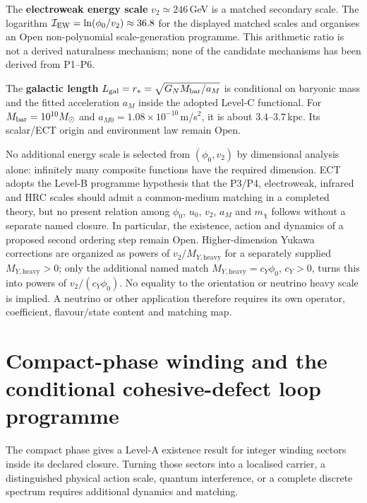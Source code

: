 \documentclass[11pt,a4paper]{article}
\begin{document}
The \textbf{electroweak energy scale} $v_2\simeq246$\,GeV is a
matched secondary scale.  The logarithm
$\mathcal I_{\rm EW}=\ln(\phi_0/v_2)\approx36.8$ for the displayed
matched scales and organises an Open non-polynomial scale-generation
programme.  This arithmetic ratio is not a derived naturalness mechanism;
none of the candidate mechanisms has been derived from P1--P6.

The \textbf{galactic length}
$L_{\rm gal}=r_*=\sqrt{G_NM_{\rm bar}/a_M}$ is conditional on
baryonic mass and the fitted acceleration $a_M$ inside the
adopted Level-C functional.  For $M_{\rm bar}=10^{10}M_\odot$ and
$a_{M0}=1.08\times10^{-10}$\,m/s$^2$, it is about
$3.4$--$3.7$\,kpc.  Its scalar/ECT origin and environment law remain
Open.

No additional energy scale is selected from $(\phi_0,v_2)$ by dimensional
analysis alone: infinitely many composite functions have the required
dimension.  ECT adopts the Level-B programme hypothesis that the P3/P4,
electroweak, infrared and HRC scales should admit a common-medium matching in a
completed theory, but no present relation among $\phi_0$, $u_0$, $v_2$, $a_M$
and $m_\chi$ follows without a separate named closure.  In particular, the
existence, action and dynamics of a proposed second ordering step remain Open.
Higher-dimension Yukawa corrections are organized as powers of
$v_2/M_{Y,\mathrm{heavy}}$ for a separately supplied
$M_{Y,\mathrm{heavy}}>0$; only the additional named match
$M_{Y,\mathrm{heavy}}=c_Y\phi_0$, $c_Y>0$, turns this into powers of
$v_2/(c_Y\phi_0)$.  No equality to the orientation or neutrino heavy scale is
implied.  A neutrino or other application therefore
requires its own operator, coefficient, flavour/state content and matching
map.

\FloatBarrier

\section{Compact-phase winding and the conditional cohesive-defect loop programme}
\label{sec:pop_loops}

The compact phase gives a Level-A existence result for integer winding
sectors inside its declared closure.  Turning those sectors into a localised
carrier, a distinguished physical action scale, quantum interference, or a
complete discrete spectrum requires additional dynamics and matching.
\end{document}
